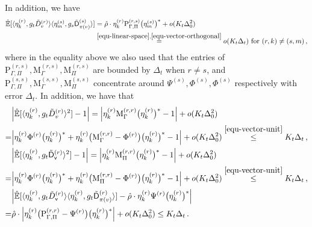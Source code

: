 \documentclass[11pt]{article}
\numberwithin{equation}{section}
\begin{document}
In addition, we have
\begin{align}
    \Hat{\mathbb{E}}[\langle \eta^{(r)}_k, g_t\Tilde{{D}}^{(r)}_{v} \rangle \langle \eta^{(s)}_m, g_s\Tilde{\mathsf{D}}^{(s)}_{\pi(v)} \rangle] &= \Hat{\rho} \cdot \eta^{(r)}_k \mathrm{P}_{\Gamma,\Pi}^{(r,s)} \big( \eta^{(s)}_m \big)^{*} + o(K_t \Delta_0^2) \nonumber \\
    &\overset{ \eqref{equ-linear-space}, \eqref{equ-vector-orthogonal} }{=}  o(K_t \Delta_t ) \mbox{ for } (r,k) \neq (s,m)  \,, \label{equ-degree-correlation-4}
\end{align}
where in the equality above we also used that the entries of $\mathrm{P}^{(r,s)}_{\Gamma,\Pi}, \mathrm{M}^{(r,s)}_{\Gamma}, \mathrm{M}^{(r,s)}_{\Pi}$ are bounded by $\Delta_{t}$ when $r \neq s$, and $\mathrm{P}^{(s,s)}_{\Gamma,\Pi}, \mathrm{M}^{(s,s)}_{\Gamma}, \mathrm{M}^{(s,s)}_{\Pi}$ concentrate around $\Psi^{(s)},\Phi^{(s)},\Phi^{(s)}$ respectively with error $\Delta_t$. In addition, we have that
\begin{align}
    & \Big| \Hat{\mathbb{E}}[ \langle \eta^{(r)}_k, g_t\Tilde{D}^{(r)}_v \rangle^2 ] - 1 \Big|  = \Big| \eta^{(r)}_k \mathrm{M}_{\Gamma}^{(r,r)} \big( \eta^{(r)}_k \big)^{*} -1 \Big| + o( K_t \Delta_0^2) \nonumber \\
    =& \Big| \eta^{(r)}_k \Phi^{(r)} \big( \eta^{(r)}_k \big)^{*} + \eta^{(r)}_k \big( \mathrm{M}_{\Gamma}^{(r,r)}-\Phi^{(r)} \big) \big( \eta^{(r)}_k \big)^{*} -1 \Big| + o(K_t \Delta_0^2) \overset{ \eqref{equ-vector-unit} }{\leq} K_t \Delta_t  \,,  \label{equ-degree-variance-1} \\
    &\Big| \Hat{\mathbb{E}}[\langle \eta^{(r)}_k, g_t\Tilde{\mathsf{D}}^{(r)}_{\mathsf{v}} \rangle^2 ] - 1 \Big| = \Big| \eta^{(r)}_k \mathrm{M}_{\Pi}^{(r,r)} \big( \eta^{(r)}_k \big)^{*} -1 \Big| + o(K_t \Delta_0^2) \nonumber\\
    =& \Big| \eta^{(r)}_k \Phi^{(r)} \big( \eta^{(r)}_k \big)^{*} +  \eta^{(r)}_k  \big( \mathrm{M}_{\Pi}^{(r,r)} - \Phi^{(r)} \big) \big( \eta^{(r)}_k \big)^{*} - 1 \Big| + o(K_t \Delta_0^2) \overset{ \eqref{equ-vector-unit} }{\leq} K_t \Delta_t  \,,  \label{equ-degree-variance-2} \\
    &\Big| \Hat{\mathbb{E}}[ \langle \eta^{(r)}_k, g_t\Tilde{{D}}^{(r)}_{\mathsf{v}} \rangle \langle \eta^{(r)}_k, g_t \Tilde{\mathsf{D}}^{(r)}_{\pi(v)} \rangle ] - \Hat{\rho} \cdot \eta^{(r)}_k \Psi^{(r)} \big( \eta^{(r)}_k \big)^{*} \Big|  \nonumber\\
    = & \Hat{\rho} \cdot \Big|  \eta^{(r)}_k  \big( \mathrm{P}_{\Gamma, \Pi}^{(r,r)} - \Psi^{(r)} \big) \big( \eta^{(r)}_k \big)^{*}  \Big| + o(K_t \Delta_0^2) \leq K_t \Delta_t  \,.  \label{equ-degree-covariance}
\end{align}
\end{document}
